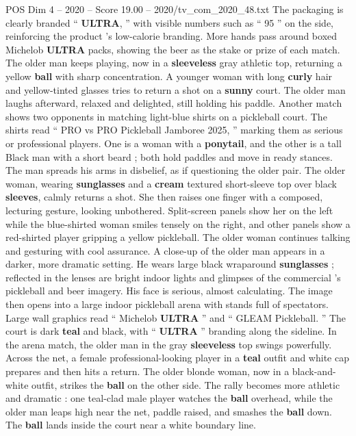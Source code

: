 \begin{textsample}{POS Dim 4 – 2020 – Score 19.00 – 2020/tv\_com\_2020\_48.txt}
The packaging is clearly branded “ \textbf{ULTRA}, ” with visible numbers such as “ 95 ” on the side, reinforcing the product ’s low-calorie branding.
More hands pass around boxed Michelob \textbf{ULTRA} packs, showing the beer as the stake or prize of each match.
The older man keeps playing, now in a \textbf{sleeveless} gray athletic top, returning a yellow \textbf{ball} with sharp concentration.
A younger woman with long \textbf{curly} hair and yellow-tinted glasses tries to return a shot on a \textbf{sunny} court.
The older man laughs afterward, relaxed and delighted, still holding his paddle.
Another match shows two opponents in matching light-blue shirts on a pickleball court.
The shirts read “ PRO vs PRO Pickleball Jamboree 2025, ” marking them as serious or professional players.
One is a woman with a \textbf{ponytail}, and the other is a tall Black man with a short beard ; both hold paddles and move in ready stances.
The man spreads his arms in disbelief, as if questioning the older pair.
The older woman, wearing \textbf{sunglasses} and a \textbf{cream} textured short-sleeve top over black \textbf{sleeves}, calmly returns a shot.
She then raises one finger with a composed, lecturing gesture, looking unbothered.
Split-screen panels show her on the left while the blue-shirted woman smiles tensely on the right, and other panels show a red-shirted player gripping a yellow pickleball.
The older woman continues talking and gesturing with cool assurance.
A close-up of the older man appears in a darker, more dramatic setting.
He wears large black wraparound \textbf{sunglasses} ; reflected in the lenses are bright indoor lights and glimpses of the commercial ’s pickleball and beer imagery.
His face is serious, almost calculating.
The image then opens into a large indoor pickleball arena with stands full of spectators.
Large wall graphics read “ Michelob \textbf{ULTRA} ” and “ GLEAM Pickleball. ” The court is dark \textbf{teal} and black, with “ \textbf{ULTRA} ” branding along the sideline.
In the arena match, the older man in the gray \textbf{sleeveless} top swings powerfully.
Across the net, a female professional-looking player in a \textbf{teal} outfit and white cap prepares and then hits a return.
The older blonde woman, now in a black-and-white outfit, strikes the \textbf{ball} on the other side.
The rally becomes more athletic and dramatic : one teal-clad male player watches the \textbf{ball} overhead, while the older man leaps high near the net, paddle raised, and smashes the \textbf{ball} down.
The \textbf{ball} lands inside the court near a white boundary line.

\end{textsample}
